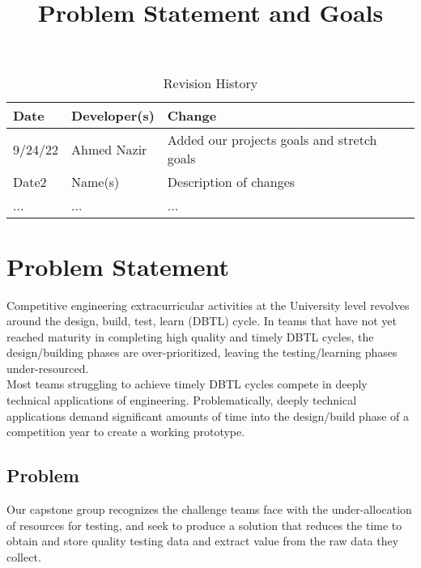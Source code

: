 \documentclass{article}
\title{Problem Statement and Goals\\\progname}
\author{\authname}
\date{}
\begin{document}
\maketitle

\begin{table}[hp]
\caption{Revision History} \label{TblRevisionHistory}
\begin{tabularx}{\textwidth}{llX}
\toprule
\textbf{Date} & \textbf{Developer(s)} & \textbf{Change}\\
\midrule
9/24/22 & Ahmed Nazir & Added our projects goals and stretch goals\\
Date2 & Name(s) & Description of changes\\
... & ... & ...\\
\bottomrule
\end{tabularx}
\end{table}

\section{Problem Statement}


Competitive engineering extracurricular activities at the University level revolves around the design, build, test, learn (DBTL) cycle. In teams that have not yet reached maturity in completing high quality and timely DBTL cycles, the design/building phases are over-prioritized, leaving the testing/learning phases under-resourced.     \\

Most teams struggling to achieve timely DBTL cycles compete in deeply technical applications of engineering. Problematically, deeply technical applications demand significant amounts of time into the design/build phase of a competition year to create a working prototype. \newpage

\subsection{Problem}

Our capstone group recognizes the challenge teams face with the under-allocation of resources for testing, and seek to produce a solution that reduces the time to obtain and store quality testing data and extract value from the raw data they collect. \\ 
\end{document}
